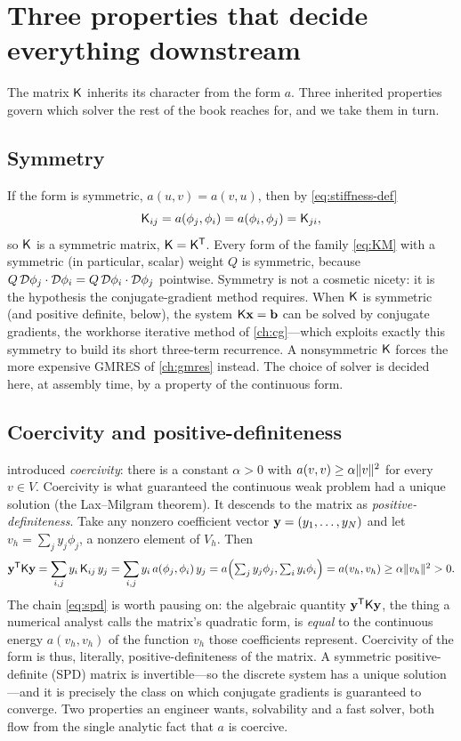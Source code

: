 \section{Three properties that decide everything downstream}

The matrix $\mathsf{K}$ inherits its character from the form $a$. Three inherited
properties govern which solver the rest of the book reaches for, and we take them
in turn.

\subsection{Symmetry}

If the form is symmetric, $a(u,v)=a(v,u)$, then by \cref{eq:stiffness-def}
\[
\mathsf{K}_{ij}=a(\phi_j,\phi_i)=a(\phi_i,\phi_j)=\mathsf{K}_{ji},
\]
so $\mathsf{K}$ is a symmetric matrix, $\mathsf{K}=\mathsf{K}^{\mathsf T}$. Every form of
the family \cref{eq:KM} with a symmetric (in particular, scalar) weight $Q$ is
symmetric, because $Q\,\mathcal{D}\phi_j\cdot\mathcal{D}\phi_i=Q\,\mathcal{D}\phi_i\cdot
\mathcal{D}\phi_j$ pointwise. Symmetry is not a cosmetic nicety: it is the hypothesis
the conjugate-gradient method requires. When $\mathsf{K}$ is symmetric (and positive
definite, below), the system $\mathsf{K}\mathbf{x}=\mathbf{b}$ can be solved by conjugate
gradients, the workhorse iterative method of \cref{ch:cg}---which exploits exactly
this symmetry to build its short three-term recurrence. A nonsymmetric $\mathsf{K}$
forces the more expensive GMRES of \cref{ch:gmres} instead. The choice of solver
is decided here, at assembly time, by a property of the continuous form.

\subsection{Coercivity and positive-definiteness}

 introduced \emph{coercivity}: there is a constant $\alpha>0$ with
$a(v,v)\ge\alpha\lVert v\rVert^2$ for every $v\in V$. Coercivity is what guaranteed the
continuous weak problem had a unique solution (the Lax--Milgram theorem). It
descends to the matrix as \emph{positive-definiteness}. Take any nonzero
coefficient vector $\mathbf{y}=(y_1,\dots,y_N)$ and let $v_h=\sum_j y_j\phi_j$, a nonzero
element of $V_h$. Then
\begin{equation}
\mathbf{y}^{\mathsf T}\mathsf{K}\mathbf{y}
=\sum_{i,j}y_i\,\mathsf{K}_{ij}\,y_j
=\sum_{i,j}y_i\,a(\phi_j,\phi_i)\,y_j
=a\Bigl(\textstyle\sum_j y_j\phi_j,\sum_i y_i\phi_i\Bigr)
=a(v_h,v_h)
\ge\alpha\lVert v_h\rVert^2>0.
\label{eq:spd}
\end{equation}
The chain \cref{eq:spd} is worth pausing on: the algebraic quantity
$\mathbf{y}^{\mathsf T}\mathsf{K}\mathbf{y}$, the thing a numerical analyst calls the matrix's
quadratic form, is \emph{equal} to the continuous energy $a(v_h,v_h)$ of the
function $v_h$ those coefficients represent. Coercivity of the form is thus,
literally, positive-definiteness of the matrix. A symmetric positive-definite
(SPD) matrix is invertible---so the discrete system has a unique solution---and it
is precisely the class on which conjugate gradients is guaranteed to converge.
Two properties an engineer wants, solvability and a fast solver, both flow from
the single analytic fact that $a$ is coercive.

